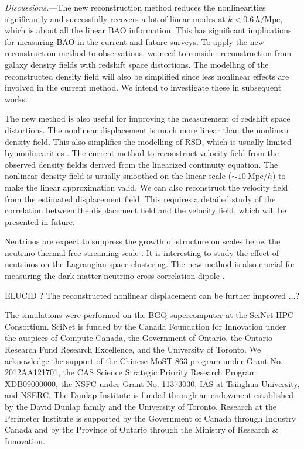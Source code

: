 \documentclass[aps,prd,twocolumn,showpacs,superscriptaddress,groupedaddress,nofootinbib]{revtex4}  %
\newcommand{\mr}{\mathrm}
\begin{document}
{\it Discussions.}---The new reconstruction method reduces the nonlinearities 
significantly and successfully recovers a lot of linear modes 
at $k<0.6\ h/\mr{Mpc}$, which is about all the linear BAO information.
This has significant implications for measuring BAO in the current and future 
surveys. 
To apply the new reconstruction method to observations, we need to consider 
reconstruction from galaxy density fields with redshift space distortions.
The modelling of the reconstructed density field will also be simplified since
less nonlinear effects are involved in the current method.
We intend to investigate these in subsequent works. 

The new method is also useful for improving the measurement of redshift space
distortions. The nonlinear displacement is much more linear than
the nonlinear density field. 
This also simplifies the modelling of RSD, which is usually
limited by nonlinearities \cite{2013PhRvD..87f3526Z}.
The current method to reconstruct velocity field from the observed density 
fieldis derived from the linearized continuity equation. 
The nonlinear density field is usually smoothed on the linear scale
($\sim10\ \mr{Mpc}/h$) to make the linear approximation valid.
We can also reconstruct the velocity field from the estimated displacement 
field.
This requires a detailed study of the correlation between the displacement 
field and the velocity field, which will be presented in future.

Neutrinos are expect to suppress the growth of structure on scales below the 
neutrino thermal free-streaming scale \cite{1980bond,1997hu}.
It is interesting to study the effect of neutrinos on the Lagrangian space 
clustering. 
The new method is also crucial for measuring the dark matter-neutrino cross 
correlation dipole \cite{2014zhm,2016zhm}. 


ELUCID \cite{2014ApJ...794...94W}?
The reconstructed nonlinear displacement can be further improved ...?


The simulations were performed on the BGQ supercomputer at the SciNet HPC 
Consortium. SciNet is funded by the Canada Foundation for Innovation under 
the auspices of Compute Canada, the Government of Ontario, the Ontario Research 
Fund Research Excellence, and the University of Toronto.
We acknowledge the support of the Chinese MoST 863 program under Grant 
No. 2012AA121701, the CAS Science Strategic Priority Research Program 
XDB09000000, the NSFC under Grant No. 11373030, IAS at Tsinghua University, 
 and NSERC.
The Dunlap Institute is funded through an endowment established by the David Dunlap family and the University of Toronto.
Research at the Perimeter Institute is supported by the Government of Canada
through Industry Canada and by the Province of Ontario through the Ministry of
Research $\&$ Innovation.



\end{document}
